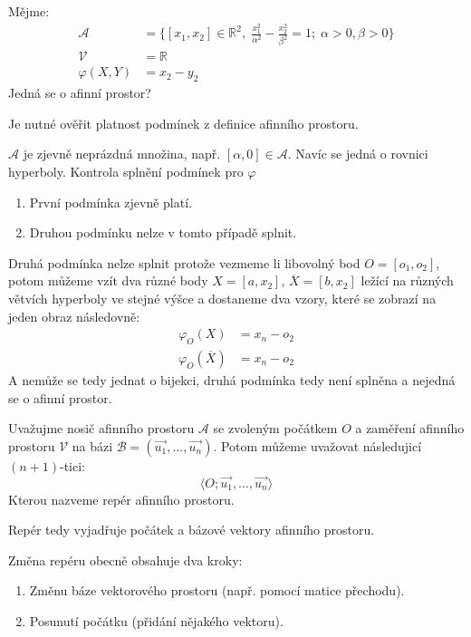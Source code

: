 \begin{example}
    Mějme:
    \begin{align*}
        \mathcal{A} &= \{[x_1, x_2] \in \mathbb{R}^2, \; \frac{x_1^2}{\alpha^2} -
        \frac{x_2^2}{\beta^2} = 1; \; \alpha > 0, \beta > 0 \}\\
        \mathcal{V} &= \mathbb{R}\\
        \varphi(X, Y) &= x_2 - y_2
    \end{align*}
    Jedná se o afinní prostor?


    Je nutné ověřit platnost podmínek z definice afinního prostoru.

    $\mathcal{A}$ je zjevně neprázdná množina, např. $[\alpha, 0] \in \mathcal{A}$.
    Navíc se jedná o rovnici hyperboly.
    Kontrola splnění podmínek pro $\varphi$
    \begin{enumerate}
        \item První podmínka zjevně platí.
        \item Druhou podmínku nelze v tomto případě splnit.
    \end{enumerate}
    Druhá podmínka nelze splnit protože vezmeme li libovolný bod $O = [o_1, o_2]$,
    potom můžeme vzít dva různé body $X = [a, x_2],\, \overline{X} = [b, x_2]$ ležící
    na různých větvích hyperboly ve stejné výšce a dostaneme dva vzory, které se zobrazí
    na jeden obraz následovně:
    \begin{align*}
        \varphi_O(X) &= x_n - o_2\\
        \varphi_O(\overline{X}) &= x_n - o_2
    \end{align*}
    A nemůže se tedy jednat o bijekci, druhá podmínka tedy není splněna a
    nejedná se o afinní prostor.
\end{example}

\begin{definition}
    Uvažujme nosič afinního prostoru $\mathcal{A}$ se zvoleným počátkem $O$ a zaměření
    afinního prostoru $\mathcal{V}$ na bázi $\mathcal{B} = (\vec{u_1},
    \ldots, \vec{u_n})$.
    Potom můžeme uvažovat následujicí $(n + 1)$-tici:
    $$\langle O; \vec{u_1}, \ldots, \vec{u_n} \rangle$$
    Kterou nazveme repér afinního prostoru.

    Repér tedy vyjadřuje počátek a bázové vektory afinního prostoru.

    Změna repéru obecně obsahuje dva kroky:
    \begin{enumerate}
        \item Změnu báze vektorového prostoru (např. pomocí matice přechodu).
        \item Posunutí počátku (přidání nějakého vektoru).
    \end{enumerate}
\end{definition}

